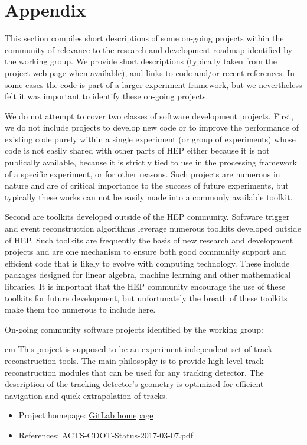 \section{Appendix}

This section compiles short descriptions of some on-going projects within the community of relevance to the research and development roadmap identified by the working group. We provide short descriptions (typically taken from the project web page when available), and links to code and/or recent references. In some cases the code is part of a larger experiment framework, but we nevertheless felt it was important to identify these on-going projects.

We do not attempt to cover two classes of software development projects. First, we do not include projects to develop new code or to improve the performance of existing code purely within a single experiment (or group of experiments) whose code is not easily shared with other parts of HEP either because it is not publically available, because it is strictly tied to use in the processing framework of a specific experiment, or for other reasons. Such projects are numerous in nature and are of critical importance to the success of future experiments, but  typically these works can not be easily made into a commonly available toolkit.

Second are toolkits developed outside of the HEP community. Software trigger and event reconstruction algorithms leverage numerous toolkits developed outside of HEP. Such toolkits are frequently the basis of new research and development projects and are one mechanism to ensure both good community support and efficient code that is likely to evolve with computing technology. These include packages designed for linear algebra, machine learning and other mathematical libraries. It is important that the HEP community encourage the use of these toolkits for future development, but unfortunately the breath of these toolkits make them too numerous to include here. 

On-going community software projects identified by the working group:

 cm 
This project is supposed to be an experiment-independent set of track reconstruction tools. The main philosophy is to provide high-level track reconstruction modules that can be used for any tracking detector. The description of the tracking detector's geometry is optimized for efficient navigation and quick extrapolation of tracks. 
\begin{itemize}
\item Project homepage: \href{https://gitlab.cern.ch/acts/a-common-tracking-sw}{GitLab homepage} 
\item References: ACTS-CDOT-Status-2017-03-07.pdf 
\end{itemize}

